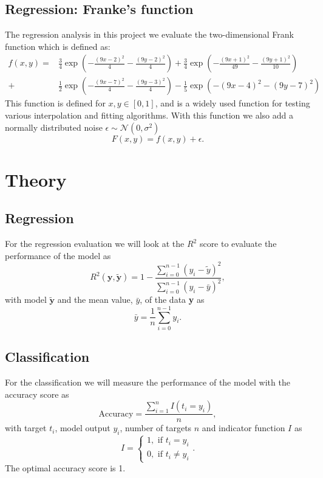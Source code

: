 \documentclass[12pt,a4paper,english]{article}
\begin{document}
\subsection{Regression: Franke's function}
The regression analysis in this project we evaluate the two-dimensional Frank function which is defined as:
\begin{align}
\label{eq:Franke_func}
f(x,y)=&\frac{3}{4}\exp\left(-\frac{(9x-2)^2}{4}-\frac{(9y-2)^2}{4}\right)+
\frac{3}{4}\exp\left(-\frac{(9x+1)^2}{49}-\frac{(9y+1)^2}{10}\right)\\ 
+& \frac{1}{2}\exp\left(-\frac{(9x-7)^2}{4}-\frac{(9y-3)^2}{4}\right)- \frac{1}{5}\exp\left(-(9x-4)^2-(9y-7)^2\right) \nonumber
\end{align}
This function is defined for $x,y\in[0,1]$, and is a widely used function for testing various interpolation and fitting algorithms. With this function we also add a normally distributed noise $\epsilon\sim \mathcal{N}(0,\sigma^2)$
\begin{equation*}
F(x,y)=f(x,y)+\epsilon.
\end{equation*}

\section{Theory}
\label{sect:Theory}
\subsection{Regression}
\label{subsect:Regression}
For the regression evaluation we will look at the $R^2$ score to evaluate the performance of the model as
\begin{equation}
\label{eq:R2_score}
R^2(\textbf{y},\tilde{\textbf{y}})=1-\frac{\sum_{i=0}^{n-1}(y_i-\tilde{y})^2}{\sum_{i=0}^{n-1}(y_i-\bar{y})^2},
\end{equation}
with model $\tilde{\textbf{y}}$ and the mean value, $\bar{y}$, of the data \textbf{y} as
\[\bar{y}=\frac{1}{n}\sum_{i=0}^{n-1}y_i.\]

\subsection{Classification}
\label{subsect:Classification}
For the classification we will measure the performance of the model with the accuracy score as
\begin{equation}
\label{eq:accuracy_score}
\text{Accuracy}=\frac{\sum_{i=1}^{n}I(t_i=y_i)}{n},
\end{equation}
with target $t_i$, model output $y_i$, number of targets $n$ and indicator function $I$ as
\[I=\begin{cases}
1, \text{ if } t_i=y_i\\
0, \text{ if } t_i\neq y_i
\end{cases}.\]
The optimal accuracy score is 1.
\end{document}
